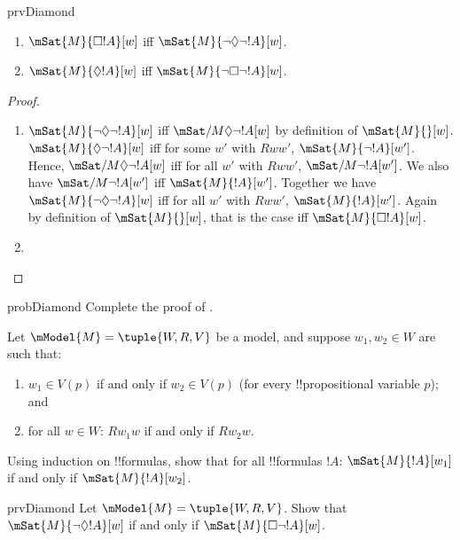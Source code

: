 \documentclass[../../../include/open-logic-section]{subfiles}
\begin{document}
\begin{tagblock}{prvDiamond}
\begin{prop}
  \begin{enumerate}
  \item $\mSat{M}{\Box !A}[w]$ iff $\mSat{M}{\lnot\Diamond\lnot !A}[w]$.
  \item $\mSat{M}{\Diamond !A}[w]$ iff $\mSat{M}{\lnot\Box\lnot !A}[w]$.
  \end{enumerate}
\end{prop}

\begin{proof}
  \begin{enumerate}
    \item $\mSat{M}{\lnot\Diamond\lnot !A}[w]$ iff $\mSat/{M}{\Diamond\lnot
      !A}[w]$ by definition of $\mSat{M}{}[w]$. $\mSat{M}{\Diamond\lnot
      !A}[w]$ iff for some $w'$ with $Rww'$, $\mSat{M}{\lnot
      !A}[w']$. Hence, $\mSat/{M}{\Diamond\lnot !A}[w]$ iff for all
    $w'$ with $Rww'$, $\mSat/{M}{\lnot !A}[w']$. We also have
    $\mSat/{M}{\lnot !A}[w']$ iff $\mSat{M}{!A}[w']$. Together we have
    $\mSat{M}{\lnot\Diamond\lnot !A}[w]$ iff for all $w'$ with $Rww'$,
    $\mSat{M}{!A}[w']$. Again by definition of $\mSat{M}{}[w]$, that
      is the case iff $\mSat{M}{\Box !A}[w]$.
    \item {}
  \end{enumerate}
\end{proof}

\begin{probtag}{probDiamond}
  Complete the proof of .
\end{probtag}
\end{tagblock}

\begin{prob}
  Let $\mModel{M} = \tuple{W, R, V}$ be a model, and suppose $w_1, w_2 \in
  W$ are such that:
  \begin{enumerate}
  \item $w_1 \in V(p)$ if and only if $w_2 \in V(p)$ (for every !!{propositional variable} $p$); and
  \item for all $w \in W$: $Rw_1w$ if and only if $Rw_2w$.
  \end{enumerate}
  Using induction on !!{formula}s, show that for all !!{formula}s $!A$:
  $\mSat{M}{!A}[w_1]$ if and only if $\mSat{M}{!A}[w_2]$.
\end{prob}

\begin{probtag}{prvDiamond}
  Let $\mModel{M} = \tuple{W, R, V}$. Show that
  $\mSat{M}{\lnot\Diamond !A}[w]$ if and only if
  $\mSat{M}{\Box\lnot!A}[w]$.
\end{probtag}
\end{document}
